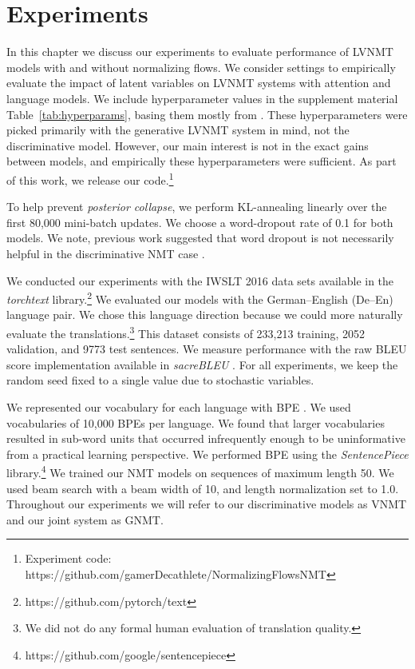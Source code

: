 \chapter{Experiments}

In this chapter we discuss our experiments to evaluate performance of \ac{LVNMT} models with and without normalizing flows. We consider settings to empirically evaluate the impact of latent variables on \ac{LVNMT} systems with attention and language models. We include hyperparameter values in the supplement material Table~\ref{tab:hyperparams}, basing them mostly from \citet{eikema2018AEVNMT}. These hyperparameters were picked primarily with the generative \ac{LVNMT} system in mind, not the discriminative model. However, our main interest is not in the exact gains between models, and empirically these hyperparameters were sufficient. As part of this work, we release our code.\footnote{Experiment code:  https://github.com/gamerDecathlete/NormalizingFlowsNMT}

To help prevent \textit{posterior collapse}, we perform KL-annealing linearly over the first 80,000 mini-batch updates. We choose a word-dropout rate of 0.1 for both models. We note, previous work suggested that word dropout is not necessarily helpful in the discriminative \ac{NMT} case \cite{harshil2018GNMT}. %

We conducted our experiments with the IWSLT 2016 data sets available in the \textit{torchtext} library.\footnote{https://github.com/pytorch/text} We evaluated our models with the German--English (De--En) language pair. We chose this language direction because we could more naturally evaluate the translations.\footnote{ We did not do any formal human evaluation of translation quality.} This dataset consists of 233,213 training, 2052 validation, and 9773 test sentences. We measure performance with the raw BLEU score implementation available in \textit{sacreBLEU} \cite{post2018SacreBLEU}. For all experiments, we keep the random seed fixed to a single value due to stochastic variables. %

We represented our vocabulary for each language with \ac{BPE} \cite{sennrich2015NMTRarwordsBPE}. We used vocabularies of 10,000 \ac{BPE}s per language. We found that larger vocabularies resulted in sub-word units that occurred infrequently enough to be uninformative from a practical learning perspective. We performed \ac{BPE} using the \textit{SentencePiece} library.\footnote{https://github.com/google/sentencepiece} We trained our \ac{NMT} models on sequences of maximum length 50. We used beam search with a beam width of 10, and length normalization set to 1.0. Throughout our experiments we will refer to our discriminative models as \ac{VNMT} and our joint system as \ac{GNMT}. %


